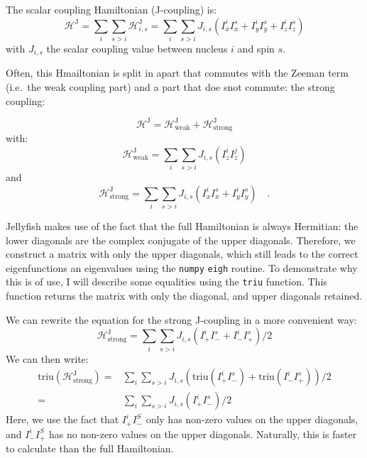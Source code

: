 \documentclass[11pt,a4paper]{article}
\begin{document}
The scalar coupling Hamiltonian (J-coupling) is:
\begin{equation}
  \mathcal{H}^\text{J} = \sum_{i}\sum_{s>i}{\mathcal{H}_{i,s}^\text{J}} = 
  \sum_{i}\sum_{s>i}{J_{i,s}(I_x^i I_x^s + I_y^i I_y^s + I_z^i I_z^s)}
\end{equation}
with $J_{i,s}$ the scalar coupling value between nucleus $i$ and spin $s$.

Often, this Hmailtonian is split in apart that commutes with the Zeeman term (i.e.\ the
weak coupling part) and a part that doe snot commute: the strong coupling:

\begin{equation}
  \mathcal{H}^\text{J} = \mathcal{H}^\text{J}_\text{weak} +
  \mathcal{H}^\text{J}_\text{strong}
\end{equation}
with:
\begin{equation}
  \mathcal{H}^\text{J}_\text{weak} = \sum_{i}\sum_{s>i}{J_{i,s}(I_z^i I_z^j)}
\end{equation}
 and
\begin{equation}
  \mathcal{H}^\text{J}_\text{strong} = \sum_{i}\sum_{s>i}{J_{i,s}(I_x^i I_x^s + I_y^i
I_y^s)}
  \quad.
\end{equation}

Jellyfish makes use of the fact that the full Hamiltonian is always Hermitian: the lower
diagonals are the complex conjugate of the upper diagonals. Therefore, we construct a
matrix with only the upper diagonals, which still leads to the correct eigenfunctions an
eigenvalues using the \texttt{numpy} \texttt{eigh} routine. To demonstrate why this is of
use, I will describe some equalities using the \texttt{triu} function. This function returns
the matrix with only the diagonal, and upper diagonals retained.

We can rewrite the equation for the strong J-coupling in a more convenient way:
\begin{equation}
  \mathcal{H}^\text{J}_\text{strong} = \sum_{i}\sum_{s>i}{J_{i,s}(I_+^i I_-^s + I_-^i
I_+^s)/2}
\end{equation}
We can then write:
\begin{align}
\text{triu}(\mathcal{H}^\text{J}_\text{strong}) =& \sum_{i}\sum_{s>i}{J_{i,s}(\text{triu}(I_+
^i I_-^s) + \text{triu}(I_-^i I_+^s))/2} \\
=& \sum_{i}\sum_{s>i}{J_{i,s}(I_+^i I_-^s )/2}
\end{align}
Here, we use the fact that $I_+^iI_-^S$ only has non-zero values on the upper diagonals,
and $I_-^iI_+^S$ has no non-zero values on the upper diagonals. Naturally, this is faster
to calculate than the full Hamiltonian.
\end{document}
